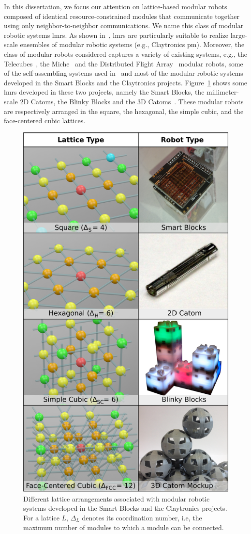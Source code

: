 In this dissertation, we focus our attention on lattice-based modular robots composed of identical resource-constrained modules that communicate together using only neighbor-to-neighbor communications. We name this class of modular robotic systems \gls{lmrs}. As shown in~\cite{bourgeois-smc2016}, \acrshort{lmrs} are particularly suitable to realize large-scale ensembles of modular robotic systems (e.g., Claytronics \gls{pm}). Moreover, the class of modular robots considered captures a variety of existing systems, e.g., the Telecubes~\cite{suh2002telecubes}, the Miche~\cite{gilpin2008miche} and the Distributed Flight Array~\cite{oung2011distributed} modular robots, some of the self-assembling systems used in~\cite{bhalla2007framework} and most of the modular robotic systems developed in the Smart Blocks and the Claytronics projects. Figure~\ref{fig:context:modular-robots} shows some \gls{lmrs} developed in these two projects, namely the Smart Blocks, the millimeter-scale 2D Catoms, the Blinky Blocks and the 3D Catoms~\cite{piranda2016geom}. These modular robots are respectively arranged in the square, the hexagonal, the simple cubic, and the face-centered cubic lattices.

\begin{figure}[!h]
	\centering
	\includegraphics[width=0.55\linewidth]{images/network-characterization/types.png}
	\caption{Different lattice arrangements associated with modular robotic systems developed in the Smart Blocks and the Claytronics projects. For a lattice $L$, $\Delta_L$ denotes its coordination number, i.e, the maximum number of modules to which a module can be connected.}
	\label{fig:context:modular-robots}
\end{figure}

